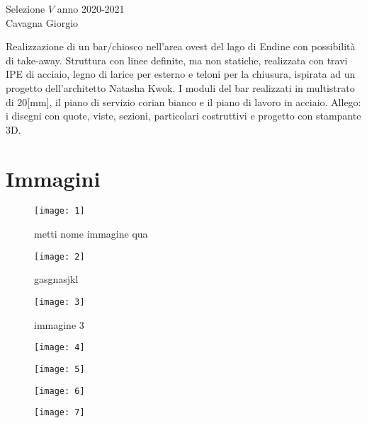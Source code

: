 \begin{center}
	\centering
	{\LARGE Selezione $V$ anno 2020-2021} \\
	\vspace{0.5cm}
	{\large Cavagna Giorgio}
	\vspace{0.5cm}
\end{center}

\noindent
Realizzazione di un bar/chiosco nell'area ovest del lago di Endine con possibilità di take-away.
Struttura con linee definite, ma non statiche, realizzata con travi IPE di acciaio, legno di larice per esterno e teloni per la chiusura, ispirata ad un progetto dell'architetto Natasha Kwok.
I moduli del bar realizzati in multistrato di 20[mm], il piano di servizio corian bianco e il piano di lavoro in acciaio.
Allego: i disegni con quote, viste, sezioni, particolari costruttivi e progetto con stampante 3D.


\clearpage
\section{Immagini}

\begin{figure}[H]
	\centering
	\texttt{[image: 1]}
	\caption{metti nome immagine qua}
\end{figure}

\begin{figure}[H]
	\centering
	\texttt{[image: 2]}
	\caption{gasgnasjkl}
\end{figure}

\begin{figure}[H]
	\centering
	\texttt{[image: 3]}
	\caption{immagine 3}
\end{figure}

\begin{figure}[H]
	\centering
	\texttt{[image: 4]}
\end{figure}

\newpage
\begin{figure}[H]
	\centering
	\texttt{[image: 5]}
\end{figure}

\begin{figure}[H]
	\centering
	\texttt{[image: 6]}
\end{figure}

\begin{figure}[H]
	\centering
	\texttt{[image: 7]}
\end{figure}

